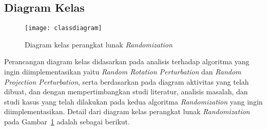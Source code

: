 \subsection{Diagram Kelas}
\label{subsec:diagram-kelas}

\begin{figure}
    \centering
    \texttt{[image: classdiagram]}
    \caption{Diagram kelas perangkat lunak \textit{Randomization}}
    \label{fig:classdiagram}
\end{figure}

Perancangan diagram kelas didasarkan pada analisis terhadap algoritma yang ingin diimplementasikan yaitu \textit{Random Rotation Perturbation} dan \textit{Random Projection Perturbation}, serta berdasarkan pada diagram aktivitas yang telah dibuat, dan dengan mempertimbangkan studi literatur, analisis masalah, dan studi kasus yang telah dilakukan pada kedua algoritma \textit{Randomization} yang ingin diimplementasikan. Detail dari diagram kelas perangkat lunak \textit{Randomization} pada Gambar~\ref{fig:classdiagram} adalah sebagai berikut.

